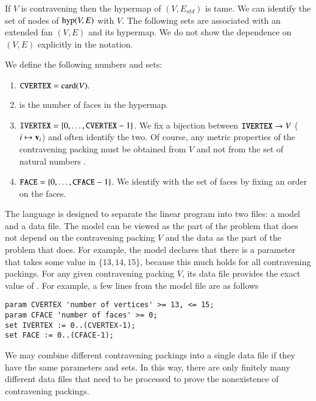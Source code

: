 If $V$ is contravening then the hypermap of $(V,E_{std})$ is tame.  We can
identify the set of nodes of ${\operatorname{hyp}}(V,E)$ with $V$.  
The following sets are associated with an extended fan $(V,E)$ and its hypermap.  
We do not
show the dependence on $(V,E)$ explicitly in the notation.

\begin{definition}
We define the following numbers and sets:
\begin{enumerate}
\item $\text{\tt CVERTEX} = {\operatorname{card}}(V).$
\item {} is the number of faces in the hypermap.
\item $\text{\tt IVERTEX} = \{ 0,\ldots, \text{\tt CVERTEX}-1\}$.  We fix a bijection
between $\text{\tt IVERTEX}\to V$ ($i\mapsto {\mathbf v}_i$) 
and often identify the two.  Of course, any metric
properties of the contravening packing must be obtained from $V$ and not
from the set of natural numbers .
\item $\text{\tt FACE}  = \{0,\ldots,\text{\tt CFACE}-1\}$.  We identify  with
the set of faces by fixing an order on the faces.
\end{enumerate}
\end{definition}

\begin{remark}
The language   is designed to separate the linear program into
two files: a model and a
data file.  The model can be viewed as the part of the problem that does not depend
on the contravening packing $V$ and the data as the part of the problem that
does.  For example, the model declares that there is a parameter
  that takes some value in $\{13,14,15\}$, because this much
holds for all contravening packings.  For any given contravening
packing $V$, its data file provides the exact value of .
For example, a few lines from the model file are as follows
\begin{verbatim}
param CVERTEX 'number of vertices' >= 13, <= 15; 
param CFACE 'number of faces' >= 0; 
set IVERTEX := 0..(CVERTEX-1);
set FACE := 0..(CFACE-1);
\end{verbatim}
\end{remark}

\begin{remark}[finiteness]
We may combine different contravening packings into a single data file if they
have the same parameters and sets.  In this way, there are only finitely many different
data files that need to be processed to prove the nonexistence of contravening
packings.
\end{remark}

